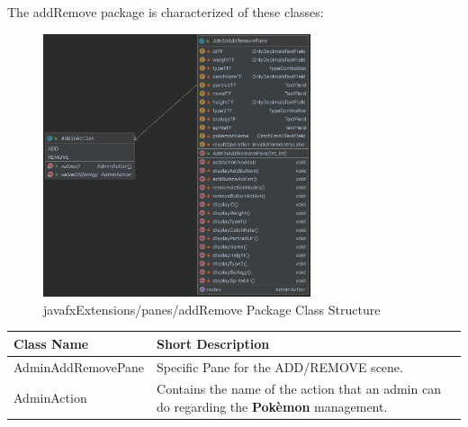 The addRemove package is characterized of these classes:
\begin{figure}[H]
	\centering
	\includegraphics[width=0.7\textwidth]{img/javafx_panes_package3.png}
	\caption{javafxExtensions/panes/addRemove Package Class Structure}
\end{figure}

\begingroup
\setlength{\tabcolsep}{10pt} %
\renewcommand{\arraystretch}{1.5} %
\begin{center}
	\begin{longtable}{| m{14em} | m{19em} |} 
		\hline
		\textbf{Class Name} & \textbf{Short Description} \\ [0.5ex] 
		\hline
		AdminAddRemovePane & Specific Pane for the ADD/REMOVE scene.\\ 
		\hline
		AdminAction & Contains the name of the action that an admin can do regarding the \textbf{Pokèmon} management.\\ 
		\hline
	\end{longtable}
\end{center}
\endgroup


